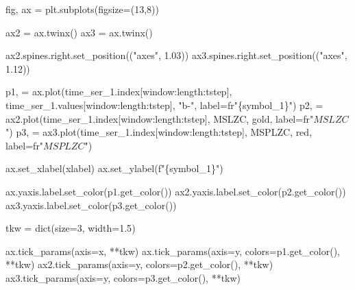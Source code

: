 \documentclass[
  letterpaper,
]{report}
\newenvironment{Shaded}{\begin{snugshade}}{\end{snugshade}}
\newcommand{\BuiltInTok}[1]{\textcolor[rgb]{0.00,0.23,0.31}{#1}}
\newcommand{\DecValTok}[1]{\textcolor[rgb]{0.68,0.00,0.00}{#1}}
\newcommand{\FloatTok}[1]{\textcolor[rgb]{0.68,0.00,0.00}{#1}}
\newcommand{\NormalTok}[1]{\textcolor[rgb]{0.00,0.23,0.31}{#1}}
\newcommand{\OperatorTok}[1]{\textcolor[rgb]{0.37,0.37,0.37}{#1}}
\newcommand{\SpecialCharTok}[1]{\textcolor[rgb]{0.37,0.37,0.37}{#1}}
\newcommand{\SpecialStringTok}[1]{\textcolor[rgb]{0.13,0.47,0.30}{#1}}
\newcommand{\StringTok}[1]{\textcolor[rgb]{0.13,0.47,0.30}{#1}}
\newcommand{\VerbatimStringTok}[1]{\textcolor[rgb]{0.13,0.47,0.30}{#1}}
\begin{document}
\begin{Shaded}
\begin{Highlighting}[]
\NormalTok{fig, ax }\OperatorTok{=}\NormalTok{ plt.subplots(figsize}\OperatorTok{=}\NormalTok{(}\DecValTok{13}\NormalTok{,}\DecValTok{8}\NormalTok{))}

\NormalTok{ax2 }\OperatorTok{=}\NormalTok{ ax.twinx()}
\NormalTok{ax3 }\OperatorTok{=}\NormalTok{ ax.twinx()}

\NormalTok{ax2.spines.right.set\_position((}\StringTok{"axes"}\NormalTok{, }\FloatTok{1.03}\NormalTok{))}
\NormalTok{ax3.spines.right.set\_position((}\StringTok{"axes"}\NormalTok{, }\FloatTok{1.12}\NormalTok{))}

\NormalTok{p1, }\OperatorTok{=}\NormalTok{ ax.plot(time\_ser\_1.index[window:length:tstep], }
\NormalTok{                time\_ser\_1.values[window:length:tstep], }
                \StringTok{"b{-}"}\NormalTok{, }
\NormalTok{                label}\OperatorTok{=}\VerbatimStringTok{fr"}\SpecialCharTok{\{}\NormalTok{symbol\_1}\SpecialCharTok{\}}\VerbatimStringTok{"}\NormalTok{)}
\NormalTok{p2, }\OperatorTok{=}\NormalTok{ ax2.plot(time\_ser\_1.index[window:length:tstep],}
\NormalTok{                MSLZC,}
                \StringTok{\textquotesingle{}gold\textquotesingle{}}\NormalTok{, }
\NormalTok{                label}\OperatorTok{=}\VerbatimStringTok{fr"$MSLZC$"}\NormalTok{)}
\NormalTok{p3, }\OperatorTok{=}\NormalTok{ ax3.plot(time\_ser\_1.index[window:length:tstep],}
\NormalTok{                MSPLZC,}
                \StringTok{\textquotesingle{}red\textquotesingle{}}\NormalTok{, }
\NormalTok{                label}\OperatorTok{=}\VerbatimStringTok{fr"$MSPLZC$"}\NormalTok{)               }


\NormalTok{ax.set\_xlabel(xlabel)}
\NormalTok{ax.set\_ylabel(}\SpecialStringTok{f"}\SpecialCharTok{\{}\NormalTok{symbol\_1}\SpecialCharTok{\}}\SpecialStringTok{"}\NormalTok{)}

\NormalTok{ax.yaxis.label.set\_color(p1.get\_color())}
\NormalTok{ax2.yaxis.label.set\_color(p2.get\_color())}
\NormalTok{ax3.yaxis.label.set\_color(p3.get\_color())}

\NormalTok{tkw }\OperatorTok{=} \BuiltInTok{dict}\NormalTok{(size}\OperatorTok{=}\DecValTok{3}\NormalTok{, width}\OperatorTok{=}\FloatTok{1.5}\NormalTok{)}

\NormalTok{ax.tick\_params(axis}\OperatorTok{=}\StringTok{\textquotesingle{}x\textquotesingle{}}\NormalTok{, }\OperatorTok{**}\NormalTok{tkw)}
\NormalTok{ax.tick\_params(axis}\OperatorTok{=}\StringTok{\textquotesingle{}y\textquotesingle{}}\NormalTok{, colors}\OperatorTok{=}\NormalTok{p1.get\_color(), }\OperatorTok{**}\NormalTok{tkw)}
\NormalTok{ax2.tick\_params(axis}\OperatorTok{=}\StringTok{\textquotesingle{}y\textquotesingle{}}\NormalTok{, colors}\OperatorTok{=}\NormalTok{p2.get\_color(), }\OperatorTok{**}\NormalTok{tkw)}
\NormalTok{ax3.tick\_params(axis}\OperatorTok{=}\StringTok{\textquotesingle{}y\textquotesingle{}}\NormalTok{, colors}\OperatorTok{=}\NormalTok{p3.get\_color(), }\OperatorTok{**}\NormalTok{tkw)}


\end{Highlighting}
\end{Shaded}
\end{document}
